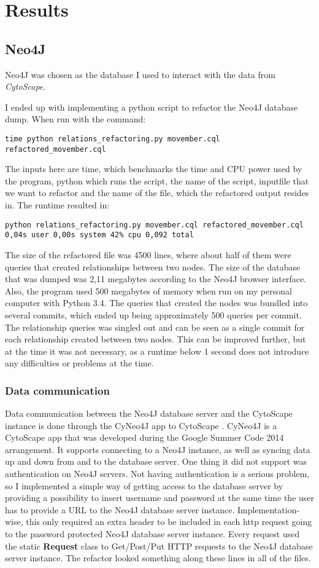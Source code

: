 \part{Results}
\label{pa:results}
\chapter{Neo4J}
Neo4J was chosen as the database I used to interact with the data from
\textit{CytoScape}.

I ended up with implementing a python script to refactor the Neo4J database
dump. When run with the command:
\begin{verbatim}
time python relations_refactoring.py movember.cql refactored_movember.cql
\end{verbatim}
The inputs here are time, which benchmarks the time and CPU power used by the
program, python which runs the script, the name of the script, inputfile that we
want to refactor and the name of the file, which the refactored output resides
in.  The runtime resulted in:
\begin{verbatim}
python relations_refactoring.py movember.cql refactored_movember.cql
0,04s user 0,00s system 42% cpu 0,092 total
\end{verbatim}
The size of the refactored file was 4500 lines, where about half of them were
queries that created relationships between two nodes. The size of the database
that was dumped was 2,11 megabytes according to the Neo4J browser interface.
Also, the program used 500 megabytes of memory when run on my personal computer
with Python 3.4. The queries that created the nodes was bundled into several
commits, which ended up being approximately 500 queries per commit. The
relationship queries was singled out and can be seen as a single commit for each
relationship created between two nodes. This can be improved further, but at the
time it was not necessary, as a runtime below 1 second does not introduce any
difficulties or problems at the time.

\section{Data communication}
Data communication between the Neo4J database server and the CytoScape instance
is done through the CyNeo4J app to CytoScape \cite{cyneo4j}. CyNeo4J is a
CytoScape app that was developed during the Google Summer Code 2014 arrangement.
It supports connecting to a Neo4J instance, as well as syncing data up and down
from and to the database server. One thing it did not support was authentication
on Neo4J servers. Not having authentication is a serious problem, so I
implemented a simple way of getting access to the database server by providing a
possibility to insert username and password at the same time the user has to
provide a URL to the Neo4J database server instance. Implementation-wise, this
only required an extra header to be included in each http request going to the
password protected Neo4J database server instance. Every request used the static
\textbf{Request} class to Get/Post/Put HTTP requests to the Neo4J database
server instance. The refactor looked something along these lines in all of the
files.

